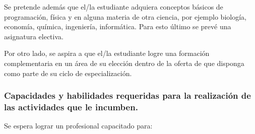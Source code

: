 \documentclass[a4paper, 12pt]{article}
\begin{document}
 Se pretende además que el/la estudiante adquiera conceptos básicos de programación, física y en alguna materia de otra ciencia, por ejemplo biología, economía, química, ingeniería, informática. Para esto último se prevé una  asignatura electiva. 

 Por otro lado, se  aspira a que el/la estudiante logre una formación complementaria en un área de su elección dentro de la oferta de que disponga como parte de su ciclo de especialización.
 
\subsubsection{Capacidades y habilidades requeridas para la realización de las actividades que le incumben.}\label{subsec:competencias}


Se espera lograr un profesional capacitado para:
\end{document}
